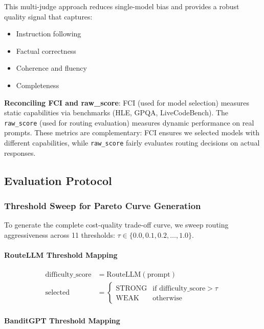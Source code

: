 \noindent This multi-judge approach reduces single-model bias and provides a robust quality signal that captures:
\begin{itemize}
    \item Instruction following
    \item Factual correctness
    \item Coherence and fluency
    \item Completeness
\end{itemize}

\noindent \textbf{Reconciling FCI and raw\_score}: FCI (used for model selection) measures static capabilities via benchmarks (HLE, GPQA, LiveCodeBench). The \texttt{raw\_score} (used for routing evaluation) measures dynamic performance on real prompts. These metrics are complementary: FCI ensures we selected models with different capabilities, while \texttt{raw\_score} fairly evaluates routing decisions on actual responses.

\subsection{Evaluation Protocol}

\subsubsection{Threshold Sweep for Pareto Curve Generation}

To generate the complete cost-quality trade-off curve, we sweep routing aggressiveness across 11 thresholds: $\tau \in \{0.0, 0.1, 0.2, \ldots, 1.0\}$.

\paragraph{RouteLLM Threshold Mapping}
\begin{align}
\text{difficulty\_score} &= \text{RouteLLM}(\text{prompt}) \\
\text{selected} &= \begin{cases}
\text{STRONG} & \text{if difficulty\_score} > \tau \\
\text{WEAK} & \text{otherwise}
\end{cases}
\end{align}

\paragraph{BanditGPT Threshold Mapping}

